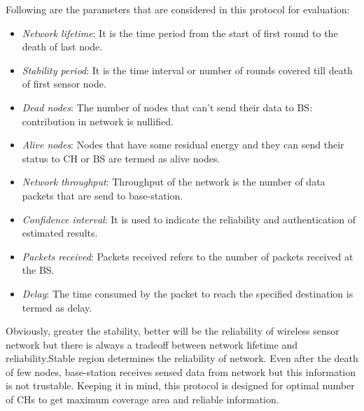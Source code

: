 \documentclass[journal]{IEEEtran}
\begin{document}
 Following are the parameters that are considered in this protocol for evaluation:
 \begin{itemize}
  \item \emph{Network lifetime}: It is the time period from the start of first round to the death of last node.
  \item \emph{Stability period}: It is the time interval or number of rounds covered till death of first sensor node.
  \item \emph{Dead nodes}: The number of nodes that can't send their data to BS: contribution in network is nullified.
  \item \emph{Alive nodes}: Nodes that have some residual energy and they can send their status to CH or BS are termed as alive nodes.
  \item \emph{Network throughput}: Throughput of the network is the number of data packets that are send to base-station.
  \item \emph{Confidence interval}: It is used to indicate the reliability and authentication of estimated results.
  \item \emph{Packets received}: Packets received refers to the number of packets received at the BS.
  \item\emph{Delay}: The time consumed by the packet to reach the specified destination is termed as delay.
 \end{itemize}
 Obviously, greater the stability, better will be the reliability of wireless sensor network but there is always a tradeoff between network lifetime and reliability.Stable region determines the reliability of network. Even after the death of few nodes, base-station receives sensed data from network but this information is not trustable. Keeping it in mind, this protocol is designed for optimal number of CHs to get maximum coverage area and reliable information.
\end{document}
